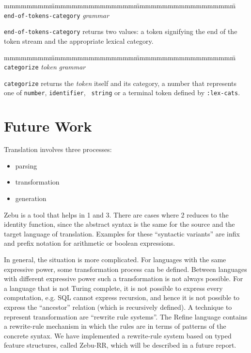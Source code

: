 \begin{tabbing}
mmmmmmmm\=mmmmmmmmmmmmmmm\=mmmmmmmmmmmmmmmmmm\=\kill
{\tt end-of-tokens-category} {\em grammar} \>\> 
\end{tabbing}

{\tt end-of-tokens-category} returns two values: a token signifying
the end of the token stream and the appropriate lexical category.


\begin{tabbing}
mmmmmmmm\=mmmmmmmmmmmmmmm\=mmmmmmmmmmmmmmmmmm\=\kill
{\tt categorize} {\em token} {\em grammar}  \>\> 
\end{tabbing}

{\tt categorize} returns the {\em token} \/ itself and its category, a
number that represents one of {\tt number}, {\tt identifier}, {\tt
  string} or a terminal token defined by {\tt :lex-cats}.

\section {Future Work}
Translation involves three processes:
\begin{itemize}
  \item parsing
  \item transformation
  \item generation
\end{itemize}

 {\sf Zebu} is a tool that helps in 1 and 3. There are cases where 2
reduces to the identity function, since the abstract syntax is the
same for the source and the target language of translation.  Examples
for these ``syntactic variants'' are infix and prefix notation for
arithmetic or boolean expressions.

 In general, the situation is more complicated.  For languages with
the same expressive power, some transformation process can be defined.
Between languages with different expressive power such a
transformation is not always possible.  For a language that is not
Turing complete, it is not possible to express every computation, e.g.
SQL cannot express recursion, and hence it is not possible to express
the ``ancestor'' relation (which is recursively defined).  A technique
to represent transformation are ``rewrite rule systems''.  The {\sf
Refine} language \cite{refine} contains a rewrite-rule mechanism in
which the rules are in terms of patterns of the concrete syntax.  We
have implemented a rewrite-rule system based on typed feature
structures, called {\sf Zebu-RR}, which will be described in a future
report.
\appendix 

